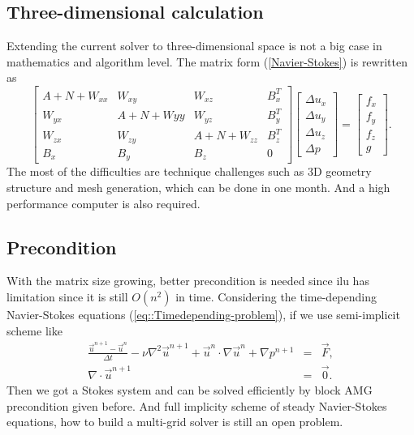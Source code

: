 \documentclass[a4paper]{article}
\begin{document}
\subsection{Three-dimensional calculation}
Extending the current solver to three-dimensional space is not a big
case in mathematics and algorithm level. The matrix form
(\ref{Navier-Stokes}) is rewritten as
\begin{equation}
\left[ \begin{array}{cccc}
A + N +W_{xx} & W_{xy} & W_{xz} & B_x^T \\
W_{yx} & A +N +W{yy}& W_{yz} & B_y^T \\
W_{zx} & W_{zy}  &A + N + W_{zz} & B_z^T \\
B_x & B_y &B_z& 0
\end{array}
\right]
\left[\begin{array}{cccc}
\Delta u_x\\
\Delta u_y\\
\Delta u_z\\
\Delta p
\end{array}
\right]=
\left[\begin{array}{cccc}
f_x\\
f_y\\
f_z\\
g
\end{array}
\right].
\label{3D-Navier-Stokes}
\end{equation}
The most of the difficulties are technique challenges such as 3D
geometry structure and mesh generation, which can be done in one
month. And a high performance computer is also required.

\subsection{Precondition}
With the matrix size growing, better precondition is needed since ilu
has limitation since it is still $O(n^2)$ in time. Considering the
time-depending Navier-Stokes equations
(\ref{eq::Timedepending-problem}), if we use semi-implicit scheme like
\begin{equation}
\begin{array}{rcl}
\frac{\vec{u}^{n+1}-\vec{u}^n}{\Delta t} - \nu \nabla^2 \vec{u}^{n+1} + \vec{u}^{n}\cdot \nabla \vec{u}^n + \nabla p^{n+1} &=& \vec{F}, \\
\nabla \cdot \vec{u}^{n+1} &=& \vec{0}.
\label{eq::implicit and explicit}
\end{array}
\end{equation}
Then we got a Stokes system and can be solved efficiently by block AMG
precondition given before. And full implicity scheme of steady
Navier-Stokes equations, how to build a multi-grid solver is still an
open problem.




\end{document}
